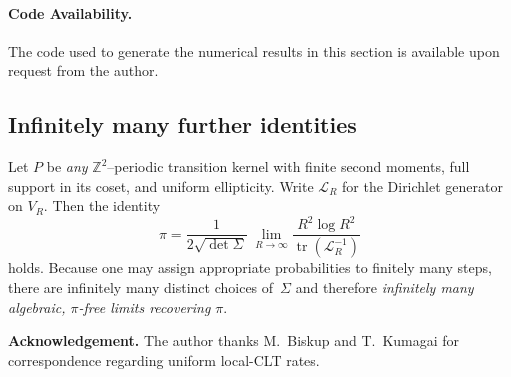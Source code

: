 \documentclass[12pt]{amsart}
\theoremstyle{definition}
\theoremstyle{remark}
\DeclareMathOperator{\tr}{tr}    %
\begin{document}
\paragraph{Code Availability.} The code used to generate the numerical results in this section is available upon request from the author.


\subsection{Infinitely many further identities}\label{app:infinite}

Let \(P\) be \emph{any} $\mathbb Z^{2}$–periodic transition kernel
with finite second moments, full support in its coset, and
uniform ellipticity.
Write \( \mathcal{L}_R \) for the Dirichlet generator on \( V_R \).
Then the identity
\[
\pi=\frac{1}{2\sqrt{\det\Sigma}}\;
      \lim_{R\to\infty}
      \frac{R^{2}\log R^{2}}{\tr(\mathcal{L}_R^{-1})}
\]
holds.
Because one may assign appropriate probabilities to
finitely many steps, there are infinitely many distinct choices of~\(\Sigma\) and therefore
\emph{infinitely many algebraic, $\pi$-free limits recovering $\pi$}.


\bigskip
\noindent\textbf{Acknowledgement.}
The author thanks M.\ Biskup and T.\ Kumagai for correspondence regarding uniform local-CLT rates.
\end{document}

